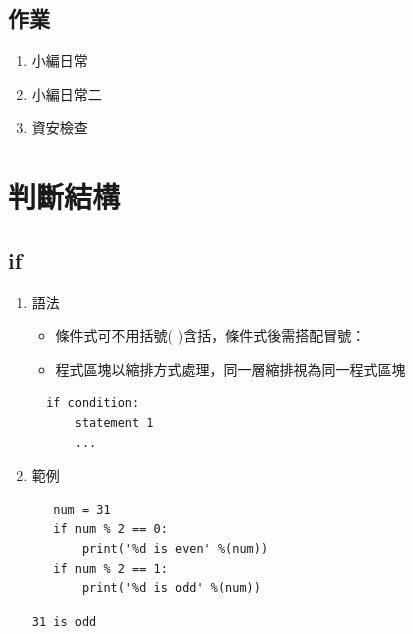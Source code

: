 \documentclass[a4paper,12pt]{article}
\begin{document}
\subsection{作業}
\label{sec:org65f6530}
\begin{enumerate}
\item 小編日常
\label{sec:orga9770e4}
\item 小編日常二
\label{sec:orgabed0f6}

\item 資安檢查
\label{sec:orge561d37}
\end{enumerate}

\section{判斷結構}
\label{py-if-else}
\subsection{if}
\label{sec:org90f848c}
\begin{enumerate}
\item 語法
\label{sec:org27c44a0}
\begin{itemize}
\item 條件式可不用括號( )含括，條件式後需搭配冒號：\\
\item 程式區塊以縮排方式處理，同一層縮排視為同一程式區塊\\
\end{itemize}

\lstset{breaklines=true,language=Python,label= ,caption= ,captionpos=b,firstnumber=1,numbers=left}
\begin{lstlisting}
  if condition:
      statement 1
      ...
\end{lstlisting}

\item 範例
\label{sec:orgd471f1d}
\lstset{breaklines=true,language=Python,label= ,caption= ,captionpos=b,firstnumber=1,numbers=left}
\begin{lstlisting}
   num = 31
   if num % 2 == 0:
       print('%d is even' %(num))
   if num % 2 == 1:
       print('%d is odd' %(num))
\end{lstlisting}

\begin{verbatim}
31 is odd
\end{verbatim}
\end{enumerate}
\end{document}
